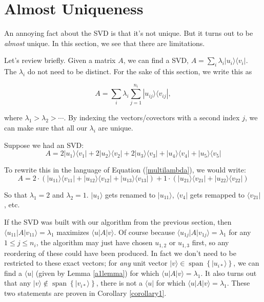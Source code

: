 \documentclass{amsbook}
\begin{document}
\section{Almost Uniqueness}\label{almost_uniqueness}

An annoying fact about the SVD is that it's not unique.  But it turns out to be {\em almost} unique.  In this section, we see that there are limitations.

Let's review briefly.  Given a matrix $A$, we can find a SVD, $A=\sum_i\lambda_i|u_i\rangle\langle v_i|$.  The $\lambda_i$ do not need to be distinct.  For the sake of this section, we write this as 

\begin{equation}
\label{multilambda}
A=\sum_i\lambda_i\sum_{j=1}^{n_i}|u_{ij}\rangle\langle v_{ij}|,
\end{equation}

 where $\lambda_1>\lambda_2>\cdots$.  By indexing the vectors/covectors with a second index $j$, we can make sure that all our $\lambda_i$ are unique.
 
\begin{tcolorbox}[title=Example,colback=blue!5]
Suppose we had an SVD:
$$
A=2|u_1\rangle\langle v_1|+2|u_2\rangle\langle v_2|+2|u_3\rangle\langle v_3|+|u_4\rangle\langle v_4|+|u_5\rangle\langle v_5|
$$

To rewrite this in the language of Equation (\ref{multilambda}), we would write:
$$
A=2\cdot\left(|u_{11}\rangle\langle v_{11}|+|u_{12}\rangle\langle v_{12}|+|u_{13}\rangle\langle v_{13}|\right)+1\cdot\left(|u_{21}\rangle\langle v_{21}|+|u_{22}\rangle\langle v_{22}|\right)
$$

So that $\lambda_1=2$ and $\lambda_2=1$.  $|u_1\rangle$ gets renamed to $|u_{11}\rangle$, $\langle v_4|$ gets remapped to $\langle v_{21}|$, etc.

\end{tcolorbox}

If the SVD was built with our algorithm from the previous section, then $\langle u_{11}|A|v_{11}\rangle=\lambda_1$ maximizes $\langle u|A|v\rangle$.  Of course because $\langle u_{1j}|A|v_{1j}\rangle=\lambda_1$ for any $1\leq j\leq n_i$, the algorithm may just have chosen $u_{1,2}$ or $u_{1,3}$ first, so any reordering of these could have been produced.  In fact we don't need to be restricted to these exact vectors; for {\em any} unit vector $|v\rangle\in\operatorname{span}\left\{|u_{i*}\rangle\right\}$, we can find a $\langle u|$ (given by Lemma \ref{a1lemma}) for which $\langle u|A|v\rangle=\lambda_1$.  It also turns out that any $|v\rangle\not\in\operatorname{span}\left\{|v_{i*}\rangle\right\}$, there is not a $\langle u|$ for which $\langle u|A|v\rangle=\lambda_1$.  These two statements are proven in Corollary \ref{corollary1}.
\end{document}
